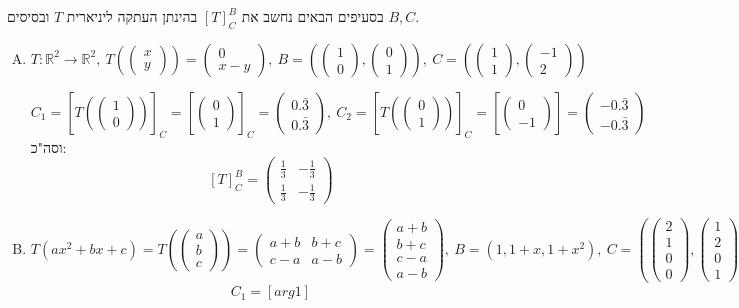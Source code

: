 \documentclass[]{article}
\newcommand\R     {\mathbb{R}}
\newcommand\co        {\colon}
\newcommand\pms[1]    {\begin{pmatrix}
		#1
\end{pmatrix}}
\newcommand\cl [1]    {\left ( #1 \right )}
\newcommand\csb[1]    {\left [ #1 \right ]}
\begin{document}
	\section{}
	בסעיפים הבאים נחשב את $[T]^B_C$ בהינתן העתקה ליניארית $T$ ובסיסים $B, C$. 
	\begin{enumerate}[A)]
		\item 
		\[ T \co \R^2 \to \R^2, \ T\cl{\pms{x \\ y}} = \pms{0 \\ x - y}, \ B = \cl{\pms{1 \\ 0}, \pms{0 \\ 1}}, \ C = \cl{\pms{1 \\ 1}, \pms{-1 \\ 2}} \]
		
		\[ C_1 = \csb{T\cl{\pms{1 \\ 0}}}_C = \csb{\pms{0 \\ 1}}_C = \pms{0.\bar3 \\ 0.\bar 3}, \ C_2 = \csb{T\cl{\pms{0 \\ 1}}}_C = \csb{\pms{0 \\ -1}} = \pms{-0.\bar 3 \\ -0.\bar3} \]
		וסה"כ: 
		\[ [T]^B_C = \pms{\frac{1}{3} & - \frac{1}{3} \\ \frac{1}{3} & -\frac{1}{3}} \]
		\item 
		\[ T(ax^2 + bx + c) = T\cl{\pms{a \\ b \\ c}} = \pms{a + b & b + c \\ c - a & a - b} = \pms{a + b \\ b + c \\ c - a \\ a - b}, \ B = (1, 1 + x, 1+ x^2), \ C = \cl{\pms{2 \\ 1 \\ 0 \\ 0}, \pms{1 \\ 2 \\ 0 \\ 1}, \pms{1 \\ 0 \\ 1 \\2}, \pms{1 \\ 0 \\ 0 \\ 0}} \]
		\begin{gather*}
			C_1 = \csb{arg1}
		\end{gather*}
		
	\end{enumerate}
	
\end{document}
